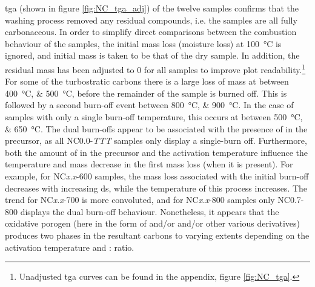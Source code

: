 \acrshort{tga} (shown in figure \ref{fig:NC_tga_adj}) of the twelve samples confirms that the washing process removed any residual  compounds, i.e. the samples are all fully carbonaceous. In order to simplify direct comparisons between the combustion behaviour of the samples, the initial mass loss (moisture loss) at \qty{100}{\degreeCelsius} is ignored, and initial mass is taken to be that of the dry sample. In addition, the residual mass has been adjusted to \qty{0}{\wtpercent} for all samples to improve plot readability.\footnote{Unadjusted \acrshort{tga} curves can be found in the appendix, figure \ref{fig:NC_tga}.} For some of the \glspl{turbostratic carbon} there is a large loss of mass at between \qtylist[list-units=single]{400;500}{\degreeCelsius}, before the remainder of the sample is burned off. This is followed by a second burn-off event between \qtylist[list-units=single]{800;900}{\degreeCelsius}. In the case of samples with only a single burn-off temperature, this occurs at between \qtylist[list-units=single]{500;650}{\degreeCelsius}. The dual burn-offs appear to be associated with the presence of  in the precursor, as all NC0.0-\textit{TTT} samples only display a single-burn off. Furthermore, both the amount of  in the precursor and the activation temperature influence the temperature and mass decrease in the first mass loss (when it is present). For example, for NC\textit{x.x}-600 samples, the mass loss associated with the initial burn-off decreases with increasing \acrshort{ds}, while the temperature of this process increases. The trend for NC\textit{x.x}-700 is more convoluted, and for NC\textit{x.x}-800 samples only NC0.7-800 displays the dual burn-off behaviour. Nonetheless, it appears that the oxidative \gls{porogen} (here in the form of  and/or  and/or other various derivatives) produces two phases in the resultant carbons to varying extents depending on the activation temperature and : ratio. 


